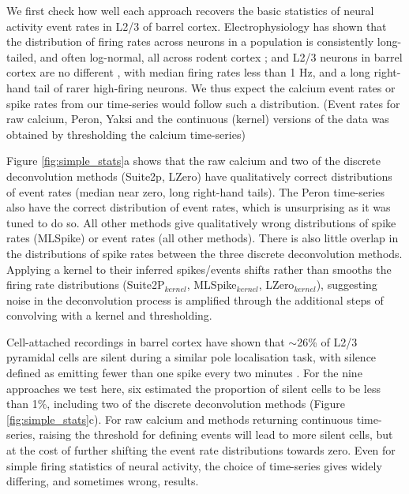 \documentclass[a4paper,11pt]{article}
\begin{document}
We first check how well each approach recovers the basic statistics of neural activity event rates in L2/3 of barrel cortex. Electrophysiology has shown that the distribution of firing rates across neurons in a population is consistently long-tailed, and often log-normal, all across rodent cortex \citep{Wohrer2013-rp}; and L2/3 neurons in barrel cortex are no different \citep{OConnor2010-hd}, with median firing rates less than 1 Hz, and a long right-hand tail of rarer high-firing neurons. We thus expect the calcium event rates or spike rates from our time-series would follow such a distribution. (Event rates for raw calcium, Peron, Yaksi and the continuous (kernel) versions of the data was obtained by thresholding the calcium time-series)

Figure \ref{fig:simple_stats}a shows that the raw calcium and two of the discrete deconvolution methods (Suite2p, LZero) have qualitatively correct distributions of event rates (median near zero, long right-hand tails). The Peron time-series also have the correct distribution of event rates, which is unsurprising as it was tuned to do so. All other methods give qualitatively wrong distributions of spike rates (MLSpike) or event rates (all other methods). There is also little overlap in the distributions of spike rates between the three discrete deconvolution methods. Applying a kernel to their inferred spikes/events shifts rather than smooths the firing rate distributions (Suite2P$_{kernel}$, MLSpike$_{kernel}$, LZero$_{kernel}$), suggesting noise in the deconvolution process is amplified through the additional steps of convolving with a kernel and thresholding.

Cell-attached recordings in barrel cortex have shown that $\sim$26\% of L2/3 pyramidal cells are silent during a similar pole localisation task, with silence defined as emitting fewer than one spike every two minutes \citep{OConnor2010-hd}. For the nine approaches we test here, six estimated the proportion of silent cells to be less than 1\%, including two of the discrete deconvolution methods (Figure \ref{fig:simple_stats}c). For raw calcium and methods returning continuous time-series, raising the threshold for defining events will lead to more silent cells, but at the cost of further shifting the event rate distributions towards zero. Even for simple firing statistics of neural activity, the choice of time-series gives widely differing, and sometimes wrong, results.
\end{document}
